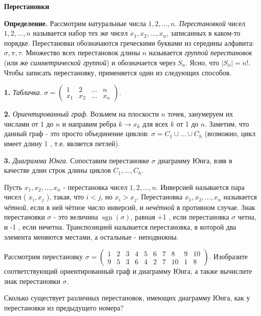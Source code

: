 \centerline{\bf \Huge Перестановки}


\textbf{Определение.} Рассмотрим натуральные числа $1,2, \ldots, n$. \textit{Перестановкой} чисел $1,2, \ldots, n$ называется набор тех же чисел $x_1, x_2, \ldots, x_n$, записанных в каком-то порядке. Перестановки обозначаются греческими буквами из середины алфавита: $\sigma, \pi, \tau$. Множество всех перестановок длины $n$ называется \textit{группой перестановок} (или же \textit{симметрической группой}) и обозначается через $S_n$. Ясно, что $\left|S_n\right|=n!$. Чтобы записать перестановку, применяется один из следующих способов.

\textbf{1.} \textit{Табличка}. $\sigma=\left(\begin{array}{cccc}1 & 2 & \ldots & n \\ x_1 & x_2 & \ldots & x_n\end{array}\right)$.

\textbf{2.} \textit{Ориентированный граф}. Возьмем на плоскости $n$ точек, занумеруем их числами от 1 до $n$ и направим ребра $k \rightarrow x_k$ для всех $k$ от 1 до $n$. Заметим, что данный граф - это просто объединение циклов: $\sigma=C_1 \cup \ldots \cup C_h$ (возможно, цикл имеет длину 1 , т.е. является петлей).

\textbf{3.} \textit{Диаграмма Юнга}. Сопоставим перестановке $\sigma$ диаграмму Юнга, взяв в качестве длин строк длины циклов $C_1, \ldots, C_h$.

Пусть $x_1, x_2, \ldots, x_n$ - перестановка чисел $1,2, \ldots, n$. Инверсией называется пара чисел ( $x_i, x_j$ ), такая, что $i<j$, но $x_i>x_j$. Перестановка $x_1, x_2, \ldots, x_n$ называется \textit{чётной}, если в ней чётное число инверсий, и \textit{нечётной} в противном случае. Знак перестановки $\sigma$ - это величина $\operatorname{sgn}(\sigma)$, равная +1 , если перестановка $\sigma$ четна, и -1 , если нечетна. Транспозицией называется перестановка, в которой два элемента меняются местами, а остальные - неподвижны.


Рассмотрим перестановку $\sigma=\left(\begin{array}{cccccccccc}1 & 2 & 3 & 4 & 5 & 6 & 7 & 8 & 9 & 10 \\ 9 & 5 & 3 & 6 & 4 & 2 & 7 & 10 & 1 & 
8\end{array}\right)$. Изобразите соответствующий ориентированный граф и диаграмму Юнга, а также вычислите знак перестановки $\sigma$.

Сколько существует различных перестановок, имеющих диаграмму Юнга, как у перестановки из предыдущего номера?

